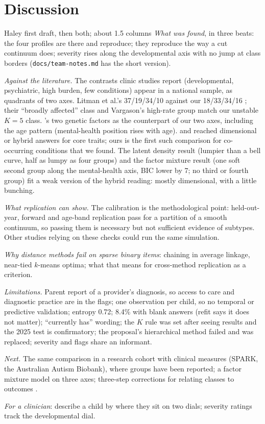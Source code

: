 \section{Discussion}
\label{sec:discussion}

\begin{stub}{Haley first draft, then both; about 1.5 columns}
\emph{What was found}, in three beats: the four profiles are there and reproduce; they reproduce the way a cut continuum does; severity rises along the developmental axis with no jump at class borders (\texttt{docs/team-notes.md} has the short version).

\emph{Against the literature.} The contrasts clinic studies report (developmental, psychiatric, high burden, few conditions) appear in a national sample, as quadrants of two axes. Litman et al.'s 37/19/34/10 against our 18/33/34/16 \citep{litman2025}; their ``broadly affected'' class and Vargason's high-rate group \citep{vargason2019} match our unstable $K=5$ class. \citet{zhang2025}'s two genetic factors as the counterpart of our two axes, including the age pattern (mental-health position rises with age). \citet{kim2019} and \citet{wittkopf2023} reached dimensional or hybrid answers for core traits; ours is the first such comparison for co-occurring conditions that we found. The latent density result (lumpier than a bell curve, half as lumpy as four groups) and the factor mixture result (one soft second group along the mental-health axis, BIC lower by 7; no third or fourth group) fit a weak version of the hybrid reading: mostly dimensional, with a little bunching.

\emph{What replication can show.} The calibration is the methodological point: held-out-year, forward and age-band replication pass for a partition of a smooth continuum, so passing them is necessary but not sufficient evidence of subtypes. Other studies relying on these checks could run the same simulation.

\emph{Why distance methods fail on sparse binary items}: chaining in average linkage, near-tied $k$-means optima; what that means for cross-method replication as a criterion.

\emph{Limitations.} Parent report of a provider's diagnosis, so access to care and diagnostic practice are in the flags; one observation per child, so no temporal or predictive validation; entropy 0.72; 8.4\% with blank answers (refit says it does not matter); ``currently has'' wording; the $K$ rule was set after seeing results and the 2025 test is confirmatory; the proposal's hierarchical method failed and was replaced; severity and flags share an informant.

\emph{Next.} The same comparison in a research cohort with clinical measures (SPARK, the Australian Autism Biobank), where groups have been reported; a factor mixture model on three axes; three-step corrections for relating classes to outcomes \citep{vermunt2010}.

\emph{For a clinician}: describe a child by where they sit on two dials; severity ratings track the developmental dial.
\end{stub}
